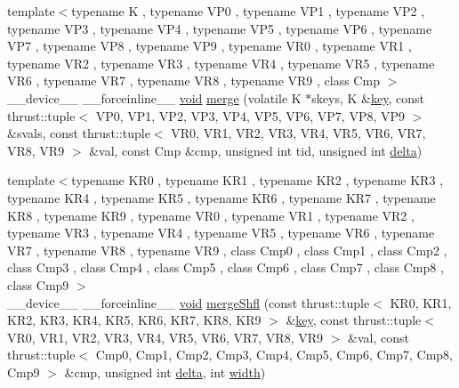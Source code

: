 \begin{DoxyCompactItemize}
{\footnotesize template$<$typename K , typename V\-P0 , typename V\-P1 , typename V\-P2 , typename V\-P3 , typename V\-P4 , typename V\-P5 , typename V\-P6 , typename V\-P7 , typename V\-P8 , typename V\-P9 , typename V\-R0 , typename V\-R1 , typename V\-R2 , typename V\-R3 , typename V\-R4 , typename V\-R5 , typename V\-R6 , typename V\-R7 , typename V\-R8 , typename V\-R9 , class Cmp $>$ }\\\-\_\-\-\_\-device\-\_\-\-\_\- \-\_\-\-\_\-forceinline\-\_\-\-\_\- \hyperlink{legacy_8hpp_a8bb47f092d473522721002c86c13b94e}{void} \hyperlink{namespacecv_1_1gpu_1_1device_1_1reduce__key__val__detail_a1f6b2d9b46509ac2ae543d9a8cad8cca}{merge} (volatile K $\ast$skeys, K \&\hyperlink{core__c_8h_a68cf695b604d08c0b6f6f6bb282a6586}{key}, const thrust\-::tuple$<$ V\-P0, V\-P1, V\-P2, V\-P3, V\-P4, V\-P5, V\-P6, V\-P7, V\-P8, V\-P9 $>$ \&svals, const thrust\-::tuple$<$ V\-R0, V\-R1, V\-R2, V\-R3, V\-R4, V\-R5, V\-R6, V\-R7, V\-R8, V\-R9 $>$ \&val, const Cmp \&cmp, unsigned int tid, unsigned int \hyperlink{legacy_8hpp_ac867054f00f4be8b1f3ebce6fba31982}{delta})
\item 
{\footnotesize template$<$typename K\-R0 , typename K\-R1 , typename K\-R2 , typename K\-R3 , typename K\-R4 , typename K\-R5 , typename K\-R6 , typename K\-R7 , typename K\-R8 , typename K\-R9 , typename V\-R0 , typename V\-R1 , typename V\-R2 , typename V\-R3 , typename V\-R4 , typename V\-R5 , typename V\-R6 , typename V\-R7 , typename V\-R8 , typename V\-R9 , class Cmp0 , class Cmp1 , class Cmp2 , class Cmp3 , class Cmp4 , class Cmp5 , class Cmp6 , class Cmp7 , class Cmp8 , class Cmp9 $>$ }\\\-\_\-\-\_\-device\-\_\-\-\_\- \-\_\-\-\_\-forceinline\-\_\-\-\_\- \hyperlink{legacy_8hpp_a8bb47f092d473522721002c86c13b94e}{void} \hyperlink{namespacecv_1_1gpu_1_1device_1_1reduce__key__val__detail_a7631b7354f0f0b05d103227a5c7e55be}{merge\-Shfl} (const thrust\-::tuple$<$ K\-R0, K\-R1, K\-R2, K\-R3, K\-R4, K\-R5, K\-R6, K\-R7, K\-R8, K\-R9 $>$ \&\hyperlink{core__c_8h_a68cf695b604d08c0b6f6f6bb282a6586}{key}, const thrust\-::tuple$<$ V\-R0, V\-R1, V\-R2, V\-R3, V\-R4, V\-R5, V\-R6, V\-R7, V\-R8, V\-R9 $>$ \&val, const thrust\-::tuple$<$ Cmp0, Cmp1, Cmp2, Cmp3, Cmp4, Cmp5, Cmp6, Cmp7, Cmp8, Cmp9 $>$ \&cmp, unsigned int \hyperlink{legacy_8hpp_ac867054f00f4be8b1f3ebce6fba31982}{delta}, int \hyperlink{highgui__c_8h_a2474a5474cbff19523a51eb1de01cda4}{width})
\item 

\end{DoxyCompactItemize}
